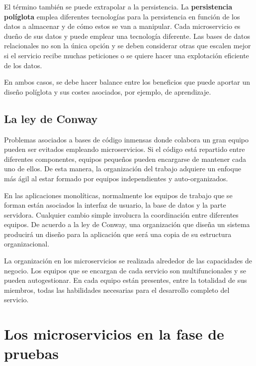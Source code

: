 \documentclass[11pt,spanish,listoffigures]{tfgetsinf}
\begin{document}
El término también se puede extrapolar a la persistencia. La \textbf{persistencia políglota} emplea diferentes tecnologías para la persistencia en función de los datos a almacenar y de cómo estos se van a manipular. Cada microservicio es dueño de sus datos y puede emplear una tecnología diferente. Las bases de datos relacionales no son la única opción y se deben considerar otras que escalen mejor si el servicio recibe muchas peticiones o se quiere hacer una explotación eficiente de los datos. \cite{Fowler2011}

En ambos casos, se debe hacer balance entre los beneficios que puede aportar un diseño políglota y sus costes asociados, por ejemplo, de aprendizaje.

\subsection{La ley de Conway}

Problemas asociados a bases de código inmensas donde colabora un gran equipo pueden ser evitados empleando microservicios. Si el código está repartido entre diferentes componentes, equipos pequeños pueden encargarse de mantener cada uno de ellos. De esta manera, la organización del trabajo adquiere un enfoque más ágil al estar formado por equipos independientes y auto-organizados. \cite{Newman2015a}

En las aplicaciones monolíticas, normalmente los equipos de trabajo que se forman están asociados la interfaz de usuario, la base de datos y la parte servidora. Cualquier cambio simple involucra la coordinación entre diferentes equipos. De acuerdo a la ley de Conway, una organización que diseña un sistema producirá un diseño para la aplicación que será una copia de su estructura organizacional.

La organización en los microservicios se realizada alrededor de las capacidades de negocio. Los equipos que se encargan de cada servicio son multifuncionales y se pueden autogestionar. En cada equipo están presentes, entre la totalidad de sus miembros, todas las habilidades necesarias para el desarrollo completo del servicio. \cite{Lewis2014}



\section{Los microservicios en la fase de pruebas} \label{sect:FasePruebas}
\end{document}
